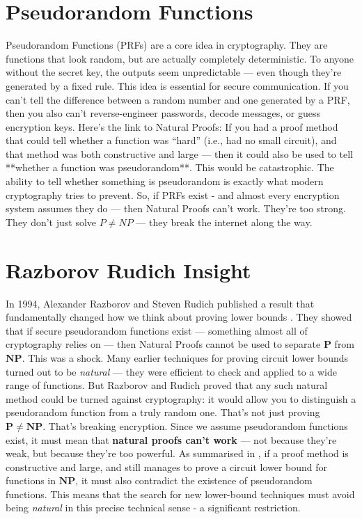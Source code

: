 \documentclass[12pt]{report}
\begin{document}
\section{Pseudorandom Functions}
Pseudorandom Functions (PRFs) are a core idea in cryptography.  
They are functions that look random, but are actually completely deterministic.  
To anyone without the secret key, the outputs seem unpredictable --- even though they're generated by a fixed rule.
This idea is essential for secure communication.  
If you can't tell the difference between a random number and one generated by a PRF, then you also can't reverse-engineer passwords, decode messages, or guess encryption keys.
Here's the link to Natural Proofs:  
If you had a proof method that could tell whether a function was “hard” (i.e., had no small circuit), and that method was both constructive and large --- then it could also be used to tell **whether a function was pseudorandom**.
This would be catastrophic. 
The ability to tell whether something is pseudorandom is exactly what modern cryptography tries to prevent.
So, if PRFs exist - and almost every encryption system assumes they do --- then Natural Proofs can't work.  
They're too strong.  
They don't just solve $P \neq NP$ --- they break the internet along the way.

\section{Razborov Rudich Insight}
In 1994, Alexander Razborov and Steven Rudich published a result that fundamentally changed how we think about proving lower bounds \cite{razborov1994}.
They showed that if secure pseudorandom functions exist --- something almost all of cryptography relies on --- then Natural Proofs cannot be used to separate $\mathbf{P}$ from $\mathbf{NP}$.
This was a shock.
Many earlier techniques for proving circuit lower bounds turned out to be \textit{natural} --- they were efficient to check and applied to a wide range of functions.  
But Razborov and Rudich proved that any such natural method could be turned against cryptography: it would allow you to distinguish a pseudorandom function from a truly random one.
That's not just proving $\mathbf{P \ne NP}$.
That's breaking encryption.  
Since we assume pseudorandom functions exist, it must mean that \textbf{natural proofs can't work} --- not because they're weak, but because they're too powerful.
As summarised in \cite{arora2009}, if a proof method is constructive and large, and still manages to prove a circuit lower bound for functions in $\mathbf{NP}$, it must also contradict the existence of pseudorandom functions.
This means that the search for new lower-bound techniques must avoid being \textit{natural} in this precise technical sense - a significant restriction.
\end{document}
